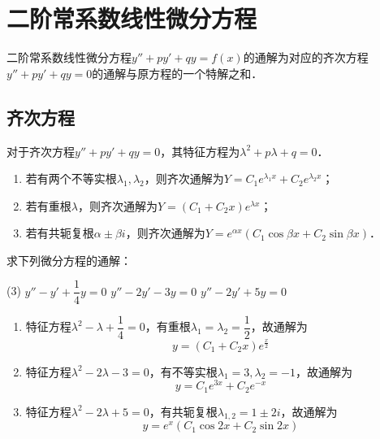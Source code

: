 \documentclass[12pt, a4paper, oneside, UTF8]{ctexbook}
\begin{document}
\section{二阶常系数线性微分方程}
\begin{theorem}[解的结构]
    二阶常系数线性微分方程$y''+py'+qy=f(x)$的通解为对应的齐次方程$y''+py'+qy=0$的通解与原方程的一个特解之和．
\end{theorem}
\subsection{齐次方程}
\begin{theorem}
    对于齐次方程$y''+py'+qy=0$，其特征方程为$\lambda^2+p\lambda+q=0$．
    \begin{enumerate}
        \item 若有两个不等实根$\lambda_1,\lambda_2$，则齐次通解为$Y=C_1e^{\lambda_1 x}+C_2e^{\lambda_2 x}$；
        \item 若有重根$\lambda$，则齐次通解为$Y=(C_1+C_2x)e^{\lambda x}$；
        \item 若有共轭复根$\alpha\pm \beta i$，则齐次通解为$Y=e^{\alpha x}(C_1\cos \beta x + C_2 \sin \beta x)$．
    \end{enumerate}
\end{theorem}
\begin{example}
    求下列微分方程的通解：
    \begin{tasks}[label=(\arabic*), ](3)
        \task $y''-y'+\dfrac{1}{4}y=0$
        \task $y''-2y'-3y=0$
        \task $y''-2y'+5y=0$
    \end{tasks}
\end{example}
\begin{solution}
    \begin{enumerate}[label=(\arabic*)]
        \item 特征方程$\lambda^2 - \lambda + \dfrac{1}{4} = 0$，有重根$\lambda_1 = \lambda_2 = \dfrac{1}{2}$，故通解为
        \[\boxed{y=(C_1 + C_2 x) e^{\frac{x}{2}}}\]
        \item 特征方程$\lambda^2 - 2\lambda - 3 = 0$，有不等实根$\lambda_1=3, \lambda_2=-1$，故通解为
        \[\boxed{y=C_1 e^{3x} + C_2 e^{-x}}\]
        \item 特征方程$\lambda^2 - 2\lambda + 5 = 0$，有共轭复根$\lambda_{1,2} = 1 \pm 2i$，故通解为
        \[\boxed{y=e^{x}(C_1 \cos 2x + C_2 \sin 2x)}\]
    \end{enumerate}
\end{solution}
\end{document}

